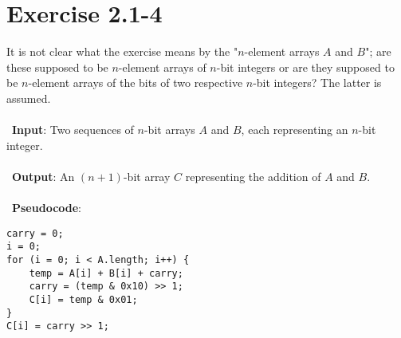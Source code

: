 \documentclass{article}
\begin{document}
\section*{Exercise 2.1-4}

It is not clear what the exercise means by the "$n$-element arrays $A$ and $B$"; are these supposed to be $n$-element arrays of $n$-bit integers or are they supposed to be $n$-element arrays of the bits of two respective $n$-bit integers? The latter is assumed.
\\ \\
\noindent~\textbf{Input}: Two sequences of $n$-bit arrays $A$ and $B$, each representing an $n$-bit integer.
\\ \\
\noindent~\textbf{Output}: An $(n + 1)$-bit array $C$ representing the addition of $A$ and $B$.
\\ \\
\noindent~\textbf{Pseudocode}:
\begin{verbatim}
carry = 0;
i = 0;
for (i = 0; i < A.length; i++) {
    temp = A[i] + B[i] + carry;
    carry = (temp & 0x10) >> 1;
    C[i] = temp & 0x01;
}
C[i] = carry >> 1;
\end{verbatim}
\end{document}
